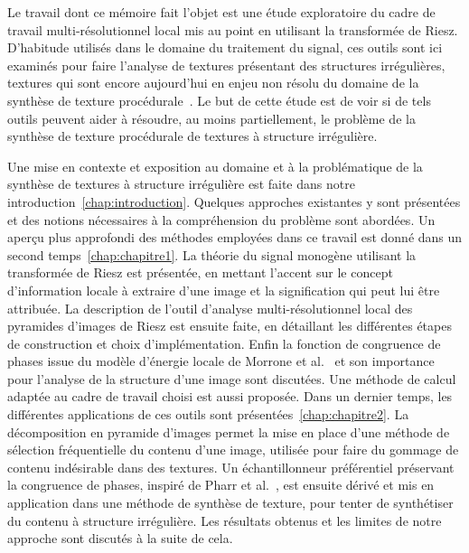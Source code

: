 \Conclusion \label{chap:conclusion}

Le travail dont ce mémoire fait l'objet est une étude exploratoire du cadre de travail multi-résolutionnel local mis au point en utilisant la transformée de Riesz. D'habitude utilisés dans le domaine du traitement du signal, ces outils sont ici examinés pour faire l'analyse de textures présentant des structures irrégulières, textures qui sont encore aujourd'hui en enjeu non résolu du domaine de la synthèse de texture procédurale~\cite{guehl_semi-procedural_2020}. Le but de cette étude est de voir si de tels outils peuvent aider à résoudre, au moins partiellement, le problème de la synthèse de texture procédurale de textures à structure irrégulière.

\bigskip

Une mise en contexte et exposition au domaine et à la problématique de la synthèse de textures à structure irrégulière est faite dans notre introduction~\ref{chap:introduction}. Quelques approches existantes y sont présentées et des notions nécessaires à la compréhension du problème sont abordées. Un aperçu plus approfondi des méthodes employées dans ce travail est donné dans un second temps~\ref{chap:chapitre1}. La théorie du signal monogène utilisant la transformée de Riesz est présentée, en mettant l'accent sur le concept d'information locale à extraire d'une image et la signification qui peut lui être attribuée. La description de l'outil d'analyse multi-résolutionnel local des pyramides d'images de Riesz est ensuite faite, en détaillant les différentes étapes de construction et choix d'implémentation. Enfin la fonction de congruence de phases issue du modèle d'énergie locale de Morrone et al.~\cite{morrone_mach_1986, morrone_feature_1987} et son importance pour l'analyse de la structure d'une image sont discutées. Une méthode de calcul adaptée au cadre de travail choisi est aussi proposée. Dans un dernier temps, les différentes applications de ces outils sont présentées~\ref{chap:chapitre2}. La décomposition en pyramide d'images permet la mise en place d'une méthode de sélection fréquentielle du contenu d'une image, utilisée pour faire du gommage de contenu indésirable dans des textures. Un échantillonneur préférentiel préservant la congruence de phases, inspiré de Pharr et al.~\cite{pharr_physically_2023}, est ensuite dérivé et mis en application dans une méthode de synthèse de texture, pour tenter de synthétiser du contenu à structure irrégulière. Les résultats obtenus et les limites de notre approche sont discutés à la suite de cela.

